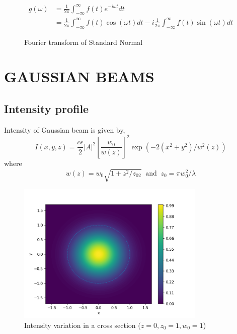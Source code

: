 \documentclass[11pt,a4paper]{article}
\begin{document}
\begin{align*}
	g(\omega)&=\frac{1}{2\pi}\int_{-\infty}^{\infty}f(t)e^{-i\omega t} dt\\
	&=\frac{1}{2\pi}\int_{-\infty}^{\infty}f(t)\cos(\omega t) dt - i \frac{1}{2\pi}\int_{-\infty}^{\infty}f(t)\sin(\omega t) dt
\end{align*}





\begin{figure}[ht]
	\centering
	\scalebox{1}{}
	\caption{Fourier transform of Standard Normal}
	\label{fig:fft_gaussian}
\end{figure}
\clearpage

\section{GAUSSIAN BEAMS}

\subsection{Intensity profile}
Intensity of Gaussian beam is given by,
$$I(x,y,z)=\frac{c\epsilon}{2} |A|^2 \left[\frac{w_0}{w(z)}\right]^2\exp{\left(-2(x^2+y^2)/w^2(z)\right)}$$ 
where
$$w(z)= w_0\sqrt{1+z^2/z_02} \;\; \text{and} \;\; z_0=\pi w_0^2/\lambda$$



\begin{figure}[htbp]
	\centering
	\includegraphics[width=9cm]{intensity.png}
	\caption{Intensity variation in a cross section ($z=0,z_0=1,w_0=1$)}
	\label{fig:intensity}
\end{figure}
\clearpage



\end{document}
